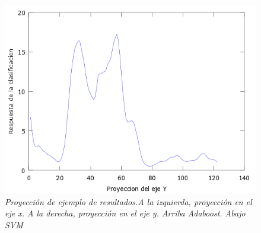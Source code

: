\begin{figure}[H]
  \includegraphics[scale=.4]{images/plots/svm5Y}
 \caption{\em  Proyección de ejemplo de resultados.A la izquierda, proyección en el eje x. A la derecha, proyección en el eje y. Arriba Adaboost. Abajo SVM}   
 \label{fig:pro5}
\end{figure}

